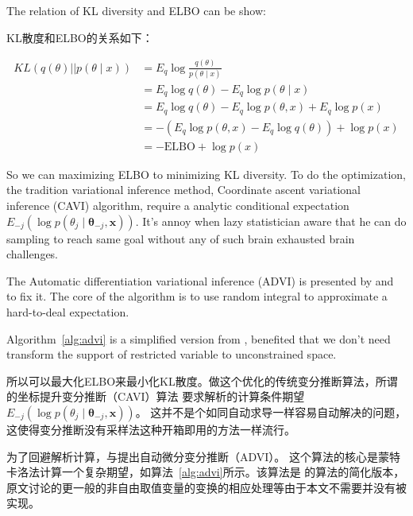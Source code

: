 \documentclass{article}
\begin{document}
The relation of KL diversity and ELBO can be show:

KL散度和ELBO的关系如下：

\begin{align*}
KL(q(\theta) || p(\theta \mid x)) &= E_q \log \frac{q(\theta)}{p(\theta \mid x)}  \\
                                  &= E_q \log q(\theta) - E_q \log p(\theta \mid x) \\
                                  &= E_q \log q(\theta) - E_q \log p(\theta,x) + E_q \log p(x) \\
                                  &= -(E_q \log p(\theta,x) -E_q \log q(\theta)) + \log p(x) \\
                                  &= -\mathrm{ELBO} + \log p(x)
\end{align*}

So we can maximizing ELBO to minimizing KL diversity. 
To do the optimization, the tradition variational inference method, 
Coordinate ascent variational inference (CAVI) algorithm,
require a analytic conditional expectation $E_{-j}(\log p(\theta_j \mid \mathbf{\theta}_{-j},\mathbf{x}))$. 
It's annoy when lazy statistician aware that he can do sampling to
reach same goal without any of such brain exhausted brain challenges. 

The Automatic differentiation variational inference (ADVI) is presented by 
\cite{kucukelbir2017automatic} and \cite{kucukelbir2014fully} to fix it. 
The core of the algorithm is to use random integral to approximate a hard-to-deal expectation.

Algorithm~\ref{alg:advi} is a simplified version from \cite{kucukelbir2017automatic}, benefited that we don't need transform
the support of restricted variable to unconstrained space.

所以可以最大化ELBO来最小化KL散度。做这个优化的传统变分推断算法，所谓的坐标提升变分推断（CAVI）算法
要求解析的计算条件期望$E_{-j}(\log p(\theta_j \mid \mathbf{\theta}_{-j},\mathbf{x}))$。
这并不是个如同自动求导一样容易自动解决的问题，这使得变分推断没有采样法这种开箱即用的方法一样流行。

为了回避解析计算，\cite{kucukelbir2017automatic}与\cite{kucukelbir2014fully}提出自动微分变分推断（ADVI）。
这个算法的核心是蒙特卡洛法计算一个复杂期望，如算法~\ref{alg:advi}所示。该算法是
\cite{kucukelbir2017automatic}的算法的简化版本，
原文讨论的更一般的非自由取值变量的变换的相应处理等由于本文不需要并没有被实现。
\end{document}

